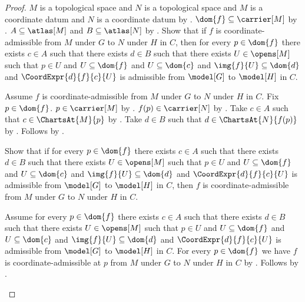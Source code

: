 \begin{proof}
    $M$ is a topological space and $N$ is a topological space and
        $M$ is a coordinate datum and $N$ is a coordinate datum by .
    $\dom{f}\subseteq\carrier[M]$ by .
    $A\subseteq\atlas[M]$ and $B\subseteq\atlas[N]$ by .
    Show that if $f$ is coordinate-admissible from $M$ under $G$ to $N$ under $H$ in $C$,
        then for every $p\in\dom{f}$ there exists $c\in A$ such that there exists $d\in B$
            such that there exists $U\in\opens[M]$ such that
                $p\in U$ and $U\subseteq\dom{f}$ and $U\subseteq\dom{c}$ and
                $\img{f}{U}\subseteq\dom{d}$ and
                $\CoordExpr{d}{f}{c}{U}$ is admissible from $\model[G]$ to $\model[H]$ in $C$.
    \begin{subproof}
        Assume $f$ is coordinate-admissible from $M$ under $G$ to $N$ under $H$ in $C$.
        Fix $p\in\dom{f}$.
        $p\in\carrier[M]$ by .
        $f(p)\in\carrier[N]$ by .
        Take $c\in A$ such that $c\in\ChartsAt{M}{p}$ by .
        Take $d\in B$ such that $d\in\ChartsAt{N}{f(p)}$ by .
        Follows by .
    \end{subproof}
    Show that if for every $p\in\dom{f}$ there exists $c\in A$ such that there exists $d\in B$
            such that there exists $U\in\opens[M]$ such that
                $p\in U$ and $U\subseteq\dom{f}$ and $U\subseteq\dom{c}$ and
                $\img{f}{U}\subseteq\dom{d}$ and
                $\CoordExpr{d}{f}{c}{U}$ is admissible from $\model[G]$ to $\model[H]$ in $C$,
        then $f$ is coordinate-admissible from $M$ under $G$ to $N$ under $H$ in $C$.
    \begin{subproof}
        Assume for every $p\in\dom{f}$ there exists $c\in A$ such that there exists $d\in B$
            such that there exists $U\in\opens[M]$ such that
                $p\in U$ and $U\subseteq\dom{f}$ and $U\subseteq\dom{c}$ and
                $\img{f}{U}\subseteq\dom{d}$ and
                $\CoordExpr{d}{f}{c}{U}$ is admissible from $\model[G]$ to $\model[H]$ in $C$.
        For every $p\in\dom{f}$ we have
            $f$ is coordinate-admissible at $p$ from $M$ under $G$ to $N$ under $H$ in $C$ by
            .
        Follows by .
    \end{subproof}
\end{proof}

